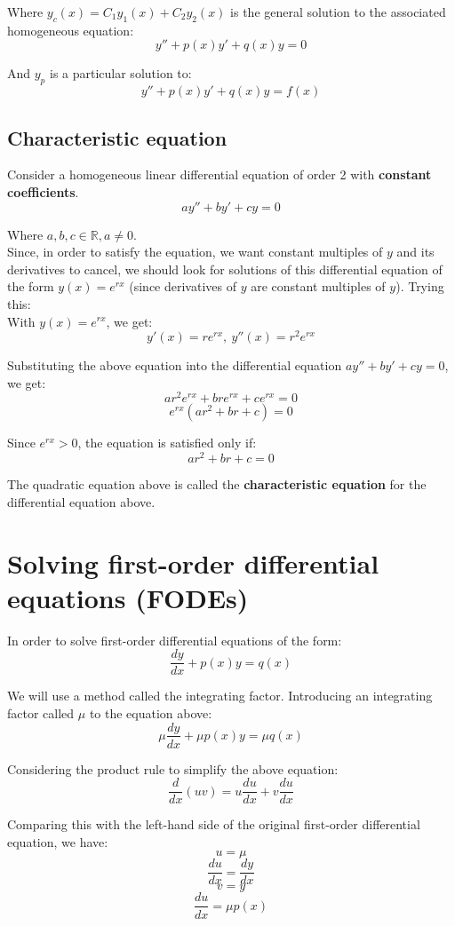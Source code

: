 \documentclass[11pt]{article}
\begin{document}
Where \(y_c(x) = C_1 y_1(x) + C_2 y_2(x)\) is the general solution to the associated homogeneous equation:
\[y'' + p(x)y' + q(x)y = 0\]

And \(y_p\) is a particular solution to:
\[y'' + p(x)y' + q(x)y = f(x)\]


\subsection{Characteristic equation}
\label{sec:org759083a}
Consider a homogeneous linear differential equation of order 2 with \textbf{constant coefficients}.
\[ay'' + by' + cy = 0\]

Where \(a, b, c \in \mathbb{R}, a \ne 0\).
\\[0pt]

Since, in order to satisfy the equation, we want constant multiples of \(y\) and its derivatives to cancel, we should look for solutions of this differential equation of the form \(y(x) = e^{rx}\) (since derivatives of \(y\) are constant multiples of \(y\)). Trying this:
\\[0pt]

With \(y(x) = e^{rx}\), we get:
\[y'(x) = re^{rx}, \ y''(x) = r^2 e^{rx}\]

Substituting the above equation into the differential equation \(ay'' + by' + cy = 0\), we get:
\[ar^2 e^{rx} + bre^{rx} + ce^{rx} = 0\]
\[e^{rx} (ar^2 + br + c) = 0\]

Since \(e^{rx} > 0\), the equation is satisfied only if:
\[ar^2 + br + c = 0\]

The quadratic equation above is called the \textbf{characteristic equation} for the differential equation above.

\newpage

\section{Solving first-order differential equations (FODEs)}
\label{sec:orga04e118}
In order to solve first-order differential equations of the form:
\[\frac{dy}{dx} + p(x)y = q(x) \tag{1}\]

We will use a method called the integrating factor. Introducing an integrating factor called \(\mu\) to the equation above:
\[\mu \frac{dy}{dx} + \mu p(x)y = \mu q(x)\]

Considering the product rule to simplify the above equation:
\[\frac{d}{dx} (uv) = u \frac{du}{dx} + v \frac{du}{dx}\]

Comparing this with the left-hand side of the original first-order differential equation, we have:
\[u = \mu \tag{2}\]
\[\frac{du}{dx} = \frac{dy}{dx} \tag{3}\]
\[v = y \tag{4}\]
\[\frac{du}{dx} = \mu p(x) \tag{5}\]
\end{document}
